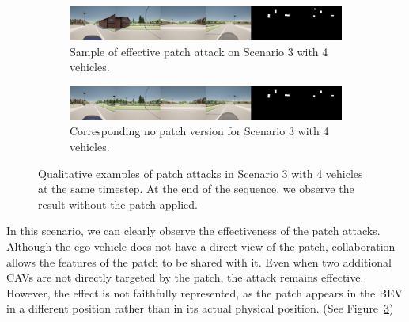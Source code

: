 \begin{figure}[tph]
    \centering
    \begin{subfigure}[b]{1\textwidth}
        \centering
        \includegraphics[width=\textwidth]{figures/results/scenario3.png}
        \caption{Sample of effective patch attack on Scenario 3 with 4 vehicles.}
        \label{fig:scenario3_4vh_v1}
    \end{subfigure}
    \vspace{0.5cm}
    \begin{subfigure}[b]{1\textwidth}
        \centering
        \includegraphics[width=\textwidth]{figures/results/scenario3gt.png}
        \caption{Corresponding no patch version for Scenario 3 with 4 vehicles.}
        \label{fig:scenario3_4vh_v1_nopatch}
    \end{subfigure}
    \caption{Qualitative examples of patch attacks in Scenario 3 with 4 vehicles at the same timestep.
        At the end of the sequence, we observe the result without the patch applied.}
    \label{fig:scenario3_4vh}
\end{figure}

In this scenario, we can clearly observe the effectiveness of the patch attacks.
Although the ego vehicle does not have a direct view of the patch, collaboration allows the features of the patch to be shared with it. Even when two additional CAVs are not directly targeted by the patch, the attack remains effective.
However, the effect is not faithfully represented, as the patch appears in the BEV in a different position rather than in its actual physical position. (See Figure~\ref{fig:scenario3_4vh})

